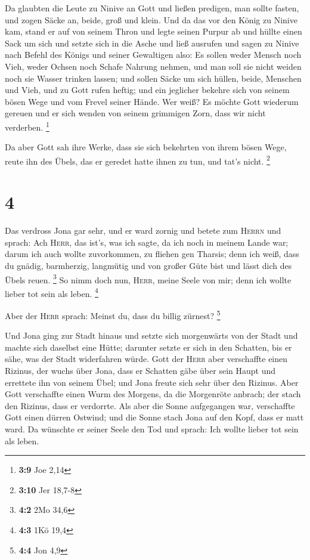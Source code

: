  Da glaubten die Leute zu Ninive an Gott und ließen
predigen, man sollte fasten, und zogen Säcke an, beide, groß und klein.
 Und da das vor den König zu Ninive kam, stand er auf von
seinem Thron und legte seinen Purpur ab und hüllte einen Sack um sich
und setzte sich in die Asche  und ließ ausrufen und sagen
zu Ninive nach Befehl des Königs und seiner Gewaltigen also: Es sollen
weder Mensch noch Vieh, weder Ochsen noch Schafe Nahrung nehmen, und man
soll sie nicht weiden noch sie Wasser trinken lassen;  und
sollen Säcke um sich hüllen, beide, Menschen und Vieh, und zu Gott rufen
heftig; und ein jeglicher bekehre sich von seinem bösen Wege und vom
Frevel seiner Hände.  Wer weiß? Es möchte Gott wiederum
gereuen und er sich wenden von seinem grimmigen Zorn, dass wir nicht
verderben. \footnote{\textbf{3:9} Joe 2,14}

 Da aber Gott sah ihre Werke, dass sie sich bekehrten von
ihrem bösen Wege, reute ihn des Übels, das er geredet hatte ihnen zu
tun, und tat's nicht. \footnote{\textbf{3:10} Jer 18,7-8}

\hypertarget{section-1}{%
\section{4}\label{section-1}}

 Das verdross Jona gar sehr, und er ward zornig
 und betete zum \textsc{Herrn} und sprach: Ach
\textsc{Herr}, das ist's, was ich sagte, da ich noch in meinem Lande
war; darum ich auch wollte zuvorkommen, zu fliehen gen Tharsis; denn ich
weiß, dass du gnädig, barmherzig, langmütig und von großer Güte bist und
lässt dich des Übels reuen. \footnote{\textbf{4:2} 2Mo 34,6}
 So nimm doch nun, \textsc{Herr}, meine Seele von mir;
denn ich wollte lieber tot sein als leben. \footnote{\textbf{4:3} 1Kö
  19,4}

 Aber der \textsc{Herr} sprach: Meinst du, dass du billig
zürnest? \footnote{\textbf{4:4} Jon 4,9}

 Und Jona ging zur Stadt hinaus und setzte sich
morgenwärts von der Stadt und machte sich daselbst eine Hütte; darunter
setzte er sich in den Schatten, bis er sähe, was der Stadt widerfahren
würde.  Gott der \textsc{Herr} aber verschaffte einen
Rizinus, der wuchs über Jona, dass er Schatten gäbe über sein Haupt und
errettete ihn von seinem Übel; und Jona freute sich sehr über den
Rizinus.  Aber Gott verschaffte einen Wurm des Morgens, da
die Morgenröte anbrach; der stach den Rizinus, dass er verdorrte.
 Als aber die Sonne aufgegangen war, verschaffte Gott
einen dürren Ostwind; und die Sonne stach Jona auf den Kopf, dass er
matt ward. Da wünschte er seiner Seele den Tod und sprach: Ich wollte
lieber tot sein als leben.

